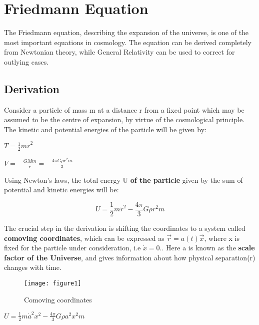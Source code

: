 \section{Friedmann Equation}
The Friedmann equation, describing the expansion of the universe, is one of the most important equations in cosmology. The equation can be derived completely from Newtonian theory, while General Relativity can be used to correct for outlying cases.

\subsection{Derivation}
Consider a particle of mass m at a distance r from a fixed point which may be assumed to be the centre of expansion, by virtue of the cosmological principle. The kinetic and potential energies of the particle will be given by:

\begin{center}
    $T = \frac{1}{2}m\dot{r}^2$ \\
\end{center}

\begin{center}
    $V = -\frac{GMm}{r} = -\frac{4\pi G \rho r^2 m}{3}$
\end{center}

Using Newton's laws, the total energy U \textbf{of the particle} given by the sum of potential and kinetic energies will be:

\begin{equation}
U = \frac{1}{2}m\dot{r}^2-\frac{4\pi}{3}G{\rho}r^2m
\end{equation}

The crucial step in the derivation is shifting the coordinates to a system called \textbf{comoving coordinates}, which can be expressed as $\vec{r}=a(t)\vec{x}$, where x is fixed for the particle under consideration, i.e $\dot{x}=0.$. Here a is known as the \textbf{scale factor of the Universe}, and gives information about how physical separation(r) changes with time.

\begin{figure}[H]
    \centering
    \texttt{[image: figure1]}
    \caption{Comoving coordinates}
    \label{fig:coord}
\end{figure}

\begin{center}
    $U = {\frac{1}{2}}{m{\dot{a}^2}{x^2}}-\frac{4\pi}{3}G{\rho}{a^2}{x^2}m$
\end{center}

